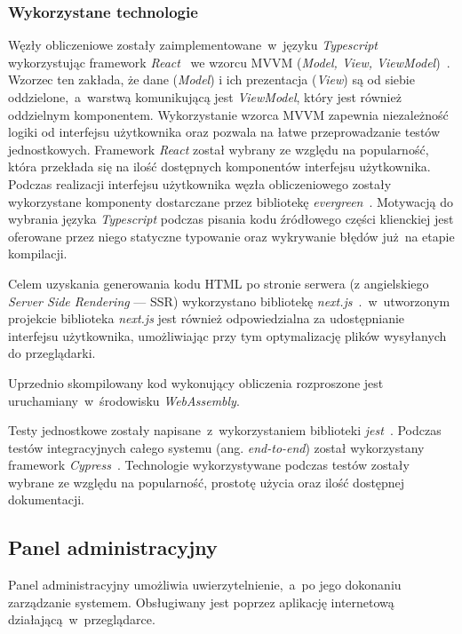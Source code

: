 \documentclass[a4paper,11pt,twoside]{report}
\theoremstyle{definition}
\begin{document}
\subsubsection{Wykorzystane technologie}
Węzły obliczeniowe zostały zaimplementowane~w~języku \textit{Typescript}~\cite{typescript} wykorzystując framework \textit{React}~\cite{react} we wzorcu MVVM (\textit{Model, View, ViewModel})~\cite{mvvm}.
Wzorzec ten zakłada, że dane (\textit{Model}) i ich prezentacja (\textit{View}) są od siebie oddzielone,~a~warstwą komunikującą jest \textit{ViewModel}, który jest również oddzielnym komponentem.
Wykorzystanie wzorca MVVM zapewnia niezależność logiki od interfejsu użytkownika oraz pozwala na łatwe przeprowadzanie testów jednostkowych.
Framework \textit{React} został wybrany ze względu na popularność, która przekłada się na ilość dostępnych komponentów interfejsu użytkownika.
Podczas realizacji interfejsu użytkownika węzła obliczeniowego zostały wykorzystane komponenty dostarczane przez bibliotekę \textit{evergreen}~\cite{evergreen}.
Motywacją do wybrania języka \textit{Typescript} podczas pisania kodu źródłowego części klienckiej jest oferowane przez niego statyczne typowanie oraz wykrywanie błędów już na etapie kompilacji.

Celem uzyskania generowania kodu HTML po stronie serwera (z angielskiego \textit{Server Side Rendering} --- SSR) wykorzystano bibliotekę \textit{next.js}~\cite{next.js}.~w~utworzonym projekcie biblioteka \textit{next.js} jest również odpowiedzialna za udostępnianie interfejsu użytkownika, umożliwiając przy tym optymalizację plików wysyłanych do przeglądarki.

Uprzednio skompilowany kod wykonujący obliczenia rozproszone jest uruchamiany~w~środowisku \textit{WebAssembly}.

Testy jednostkowe zostały napisane~z~wykorzystaniem biblioteki \textit{jest}~\cite{jest}. Podczas testów integracyjnych całego systemu (ang. \textit{end-to-end}) został wykorzystany framework \textit{Cypress}~\cite{cypress}. Technologie wykorzystywane podczas testów zostały wybrane ze względu na popularność, prostotę użycia oraz ilość dostępnej dokumentacji.

\subsection{Panel administracyjny}

Panel administracyjny umożliwia uwierzytelnienie,~a~po jego dokonaniu zarządzanie systemem. Obsługiwany jest poprzez aplikację internetową działającą~w~przeglądarce.
\end{document}
